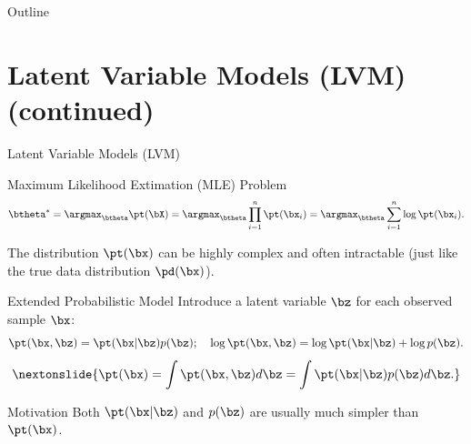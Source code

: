 \documentclass{beamer}
\begin{document}
\begin{frame}{Outline}
    \tableofcontents
\end{frame}
\section{Latent Variable Models (LVM) (continued)}
\begin{frame}{Latent Variable Models (LVM)}
	\begin{block}{Maximum Likelihood Extimation (MLE) Problem}
		\vspace{-0.7cm}
		\[
			\btheta^* = \argmax_{\btheta} \pt(\bX) = \argmax_{\btheta} \prod_{i=1}^n \pt(\bx_i) = \argmax_{\btheta} \sum_{i=1}^n \log \pt(\bx_i).
		\]
		\vspace{-0.5cm}
	\end{block}
    \eqpause
	The distribution $\pt(\bx)$ can be highly complex and often intractable (just like the true data distribution $\pd(\bx)$).
    \eqpause
	\begin{block}{Extended Probabilistic Model}
		Introduce a latent variable $\bz$ for each observed sample $\bx$:
		\[
			\pt(\bx, \bz) = \pt(\bx | \bz) p(\bz); \quad 
		\log \pt(\bx, \bz) = \log \pt(\bx | \bz) + \log p(\bz).
		\]
		\[
			\nextonslide{\pt(\bx) = \int \pt(\bx, \bz) d\bz = \int \pt(\bx | \bz) p(\bz) d\bz.}
		\]
	\end{block}
    \eqpause
	\vspace{-0.3cm}
	\begin{block}{Motivation}
		Both $\pt(\bx | \bz)$ and $p(\bz)$ are usually much simpler than $\pt(\bx)$.
	\end{block}
\end{frame}
\end{document}
